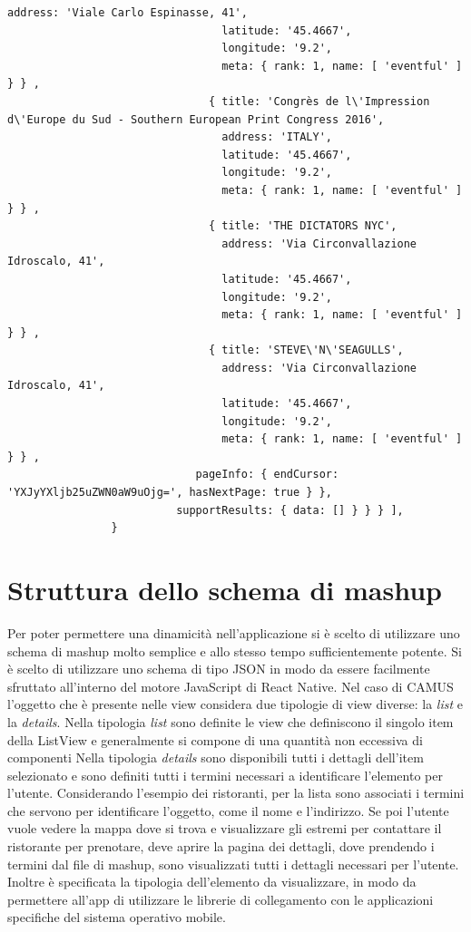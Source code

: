 \begin{lstlisting}[backgroundcolor = \color{lightgray},
								caption = Esempio Data Store Mashup,
								label = lst:store-two-topics]
			                     address: 'Viale Carlo Espinasse, 41',
			                     latitude: '45.4667',
			                     longitude: '9.2',
			                     meta: { rank: 1, name: [ 'eventful' ] } } ,
			                   { title: 'Congrès de l\'Impression d\'Europe du Sud - Southern European Print Congress 2016',
			                     address: 'ITALY',
			                     latitude: '45.4667',
			                     longitude: '9.2',
			                     meta: { rank: 1, name: [ 'eventful' ] } } ,
			                   { title: 'THE DICTATORS NYC',
			                     address: 'Via Circonvallazione Idroscalo, 41',
			                     latitude: '45.4667',
			                     longitude: '9.2',
			                     meta: { rank: 1, name: [ 'eventful' ] } } ,
			                   { title: 'STEVE\'N\'SEAGULLS',
			                     address: 'Via Circonvallazione Idroscalo, 41',
			                     latitude: '45.4667',
			                     longitude: '9.2',
			                     meta: { rank: 1, name: [ 'eventful' ] } } ,
				             pageInfo: { endCursor: 'YXJyYXljb25uZWN0aW9uOjg=', hasNextPage: true } },
				          supportResults: { data: [] } } } ],
				}

\end{lstlisting}

\section{Struttura dello schema di mashup}

Per poter permettere una dinamicità nell'applicazione si è scelto di utilizzare uno schema di mashup molto semplice e allo stesso tempo sufficientemente potente. Si è scelto di utilizzare uno schema di tipo JSON in modo da essere facilmente sfruttato all'interno del motore JavaScript di React Native. 
Nel caso di CAMUS l'oggetto che è presente nelle view considera due tipologie di view diverse: la \emph{list} e la \emph{details}. Nella tipologia \emph{list} sono definite le view che definiscono il singolo item della ListView e generalmente si compone di una quantità non eccessiva di componenti
Nella tipologia \emph{details} sono disponibili tutti i dettagli dell'item selezionato e sono definiti tutti i termini necessari a identificare l'elemento per l'utente.
Considerando l'esempio dei ristoranti, per la lista sono associati i termini che servono per identificare l'oggetto, come il nome e l'indirizzo. Se poi l'utente vuole vedere la mappa dove si trova e visualizzare gli estremi per contattare il ristorante per prenotare, deve aprire la pagina dei dettagli, dove prendendo i termini dal file di mashup, sono visualizzati tutti i dettagli necessari per l'utente. Inoltre è specificata la tipologia dell'elemento da visualizzare, in modo da permettere all'app di utilizzare le librerie di collegamento con le applicazioni specifiche del sistema operativo mobile.


